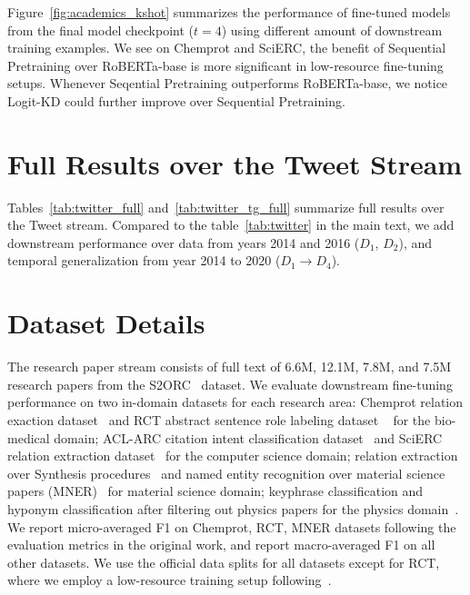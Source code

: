 Figure~\ref{fig:academics_kshot} summarizes the performance of fine-tuned models from the final model checkpoint ($t=4$) using different amount of downstream training examples. We see on Chemprot and SciERC, the benefit of Sequential Pretraining over RoBERTa-base is more significant in low-resource fine-tuning setups. 
Whenever Seqential Pretraining outperforms RoBERTa-base, we notice Logit-KD could further improve over Sequential Pretraining.

\section{Full Results over the Tweet Stream}
\label{apdx:full_tweet_results}



Tables~\ref{tab:twitter_full} and~\ref{tab:twitter_tg_full} summarize full results over the Tweet stream. Compared to the table~\ref{tab:twitter} in the main text, we add downstream performance over data from years 2014 and 2016 ($D_1$, $D_2$), and temporal generalization from year 2014 to 2020 ($D_1 \to D_4$). 

\section{Dataset Details}
\label{apdx:dataset_details}
The research paper stream consists of full text of 6.6M, 12.1M, 7.8M, and 7.5M research papers from the S2ORC~\cite{Lo2020S2ORCTS} dataset. We evaluate downstream fine-tuning performance on two in-domain datasets for each research area:
Chemprot relation exaction dataset~\cite{Vindahl2016ChemProt30AG} and RCT abstract sentence role labeling dataset ~\cite{Dernoncourt2017PubMed2R} for the bio-medical domain; 
ACL-ARC citation intent classification dataset~\cite{Jurgens2018MeasuringTE} and SciERC relation extraction dataset~\cite{Luan2018MultiTaskIO} for the computer science domain; 
relation extraction over Synthesis procedures~\cite{mysore2019materials} and named entity recognition over material science papers (MNER)~\cite{olivetti2020data} for material science domain; keyphrase classification and hyponym classification after filtering out physics papers for the physics domain~\cite{augenstein2017semeval}. We report micro-averaged F1 on Chemprot, RCT, MNER datasets following the evaluation metrics in the original work, and report macro-averaged F1 on all other datasets. We use the official data splits for all datasets except for RCT, where we employ a low-resource training setup following~\citet{Gururangan2020DontSP}. %

